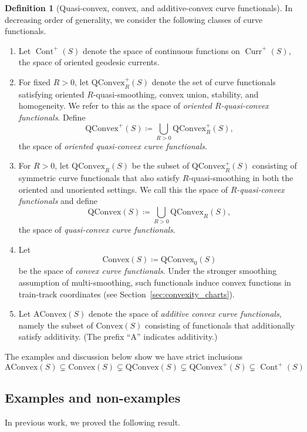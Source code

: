 \documentclass[11pt]{amsart}
\numberwithin{equation}{section}
\numberwithin{figure}{section}
\theoremstyle{definition}
\newtheorem{definition}[theorem]{Definition}
\theoremstyle{plain}
\DeclareMathOperator{\Curr}{Curr}
\newcommand{\AConvex}{\mathrm{AConvex}}
\newcommand{\Convex}{\mathrm{Convex}}
\newcommand{\QConvex}{\mathrm{QConvex}}
\begin{document}
\begin{definition}[Quasi-convex, convex, and additive-convex curve functionals]
In decreasing order of generality, we consider the following classes of
curve functionals.

\begin{enumerate}
\item Let $\operatorname{Cont}^+(S)$ denote the space of continuous functions on $\Curr^+(S)$, the space of oriented geodesic currents.
\item For fixed $R>0$, let $\QConvex_R^+(S)$ denote the set of curve
functionals satisfying oriented $R$-quasi-smoothing, convex union,
stability, and homogeneity. We refer to this as the space of
\emph{oriented $R$-quasi-convex functionals}. Define
\[
\QConvex^+(S) \coloneqq \bigcup_{R>0} \QConvex_R^+(S),
\]
the space of \emph{oriented quasi-convex curve functionals}.

\item For $R>0$, let $\QConvex_R(S)$ be the subset of
$\QConvex_R^+(S)$ consisting of symmetric curve functionals that also
satisfy $R$-quasi-smoothing in both the oriented and unoriented
settings. We call this the space of \emph{$R$-quasi-convex functionals}
and define
\[
\QConvex(S) \coloneqq \bigcup_{R>0} \QConvex_R(S),
\]
the space of \emph{quasi-convex curve functionals}.

\item Let
\[
\Convex(S) \coloneqq \QConvex_{0}(S)
\]
be the space of \emph{convex curve functionals}.
Under the stronger smoothing assumption of multi-smoothing, such functionals induce convex
functions in train-track coordinates (see
Section~\ref{sec:convexity_charts}).

\item Let $\AConvex(S)$ denote the space of \emph{additive convex curve
functionals}, namely the subset of $\Convex(S)$ consisting of
functionals that additionally satisfy additivity.
(The prefix ``A'' indicates additivity.)

\end{enumerate}
\end{definition}

The examples and discussion below show we have strict inclusions
\[
\AConvex(S) \subsetneq \Convex(S) \subsetneq  \QConvex(S) \subsetneq \QConvex^+(S) \subsetneq \operatorname{Cont}^+(S)
\]


\subsection{Examples and non-examples}
\label{subsec:examples_and_non}
In previous work, we proved the following result.
\end{document}
